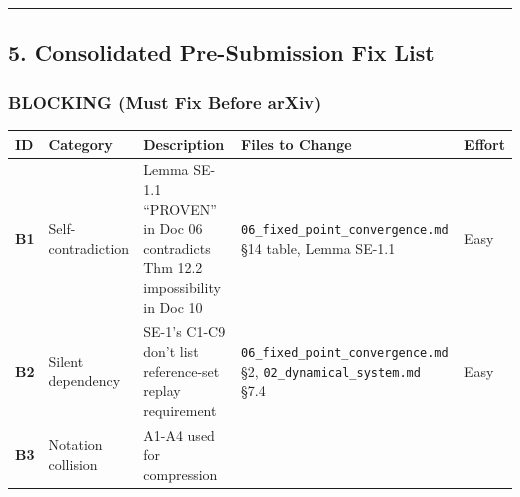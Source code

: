 \documentclass[
  12pt,
]{ctexart}
\begin{document}
\begin{center}\rule{0.5\linewidth}{0.5pt}\end{center}

\subsection{5. Consolidated Pre-Submission Fix
List}\label{consolidated-pre-submission-fix-list}

\subsubsection{BLOCKING (Must Fix Before
arXiv)}\label{blocking-must-fix-before-arxiv}

\begin{longtable}[]{@{}
  >{\raggedright\arraybackslash}p{}
  >{\raggedright\arraybackslash}p{}
  >{\raggedright\arraybackslash}p{}
  >{\raggedright\arraybackslash}p{}
  >{\raggedright\arraybackslash}p{}@{}}
\toprule\noalign{}
\begin{minipage}[b]{\linewidth}\raggedright
ID
\end{minipage} & \begin{minipage}[b]{\linewidth}\raggedright
Category
\end{minipage} & \begin{minipage}[b]{\linewidth}\raggedright
Description
\end{minipage} & \begin{minipage}[b]{\linewidth}\raggedright
Files to Change
\end{minipage} & \begin{minipage}[b]{\linewidth}\raggedright
Effort
\end{minipage} \\
\midrule\noalign{}
\endhead
\bottomrule\noalign{}
\endlastfoot
\textbf{B1} & Self-contradiction & Lemma SE-1.1 ``PROVEN'' in Doc 06
contradicts Thm 12.2 impossibility in Doc 10 &
\texttt{06\_fixed\_point\_convergence.md} §14 table, Lemma SE-1.1 &
Easy \\
\textbf{B2} & Silent dependency & SE-1's C1-C9 don't list reference-set
replay requirement & \texttt{06\_fixed\_point\_convergence.md} §2,
\texttt{02\_dynamical\_system.md} §7.4 & Easy \\
\textbf{B3} & Notation collision & A1-A4 used for compression

\end{longtable}
\end{document}
